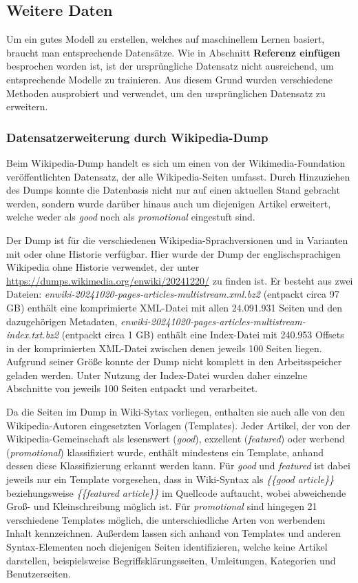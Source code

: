\subsection{Weitere Daten}
Um ein gutes Modell zu erstellen, welches auf maschinellem Lernen basiert, braucht man entsprechende Datensätze. Wie in Abschnitt \textbf{Referenz einfügen} besprochen worden ist, ist der ursprüngliche Datensatz nicht ausreichend, um entsprechende Modelle zu trainieren. Aus diesem Grund wurden verschiedene Methoden ausprobiert und verwendet, um den ursprünglichen Datensatz zu erweitern.

\subsubsection{Datensatzerweiterung durch Wikipedia-Dump}
\label{WPDump}
Beim Wikipedia-Dump handelt es sich um einen von der Wikimedia-Foundation veröffentlichten Datensatz, der alle Wikipedia-Seiten umfasst. Durch Hinzuziehen des Dumps konnte die Datenbasis nicht nur auf einen aktuellen Stand gebracht werden, sondern wurde darüber hinaus auch um diejenigen Artikel erweitert, welche weder als \emph{good} noch als \emph{promotional} eingestuft sind.

Der Dump ist für die verschiedenen Wikipedia-Sprachversionen und in Varianten mit oder ohne Historie verfügbar. Hier wurde der Dump der englischsprachigen Wikipedia ohne Historie verwendet, der unter \url{https://dumps.wikimedia.org/enwiki/20241220/} zu finden ist. Er besteht aus zwei Dateien: \emph{enwiki-20241020-pages-articles-multistream.xml.bz2} (entpackt circa 97 GB) enthält eine komprimierte XML-Datei mit allen 24.091.931 Seiten und den dazugehörigen Metadaten, \emph{enwiki-20241020-pages-articles-multistream-index.txt.bz2} (entpackt circa 1 GB) enthält eine Index-Datei mit 240.953 Offsets in der komprimierten XML-Datei zwischen denen jeweils 100 Seiten liegen. Aufgrund seiner Größe konnte der Dump nicht komplett in den Arbeitsspeicher geladen werden. Unter Nutzung der Index-Datei wurden daher einzelne Abschnitte von jeweils 100 Seiten entpackt und verarbeitet.

Da die Seiten im Dump in Wiki-Sytax vorliegen, enthalten sie auch alle von den Wikipedia-Autoren eingesetzten Vorlagen (Templates). Jeder Artikel, der von der Wiki\-pedia-Gemeinschaft als lesenswert (\emph{good}), exzellent (\emph{featured}) oder werbend (\emph{promotional}) klassifiziert wurde, enthält mindestens ein Template, anhand dessen diese Klassifizierung erkannt werden kann. Für \emph{good} und \emph{featured} ist dabei jeweils nur ein Template vorgesehen, dass in Wiki-Syntax als \textit{\{\{good article\}\}} beziehungsweise \textit{\{\{featured article\}\}} im Quellcode auftaucht, wobei abweichende Groß- und Kleinschreibung möglich ist. Für \emph{promotional} sind hingegen 21 verschiedene Templates möglich, die unterschiedliche Arten von werbendem Inhalt kennzeichnen. Außerdem lassen sich anhand von Templates und anderen Syntax-Elementen noch diejenigen Seiten identifizieren, welche keine Artikel darstellen, beispielsweise Begriffsklärungsseiten, Umleitungen, Kategorien und Benutzerseiten.

